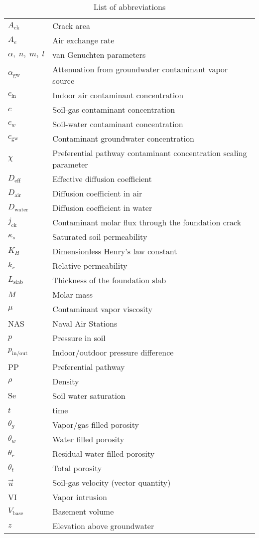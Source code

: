 \documentclass[journal=esthag,manuscript=article]{achemso}
\begin{document}
\begin{table}[htb!]
  \caption{List of abbreviations}\label{tbl:abbreviations}
\begin{tabular}{l l}
  \toprule
  $A_\mathrm{ck}$ & Crack area \\
  $A_e$ & Air exchange rate \\
  $\alpha, \; n, \; m, \; l$ & van Genuchten parameters \\
  $\alpha_\mathrm{gw}$ & Attenuation from groundwater contaminant vapor source \\
  $c_\mathrm{in}$ & Indoor air contaminant concentration \\
  $c$ & Soil-gas contaminant concentration \\
  $c_w$ & Soil-water contaminant concentration \\
  $c_\mathrm{gw}$ & Contaminant groundwater concentration \\
  $\chi$ & Preferential pathway contaminant concentration scaling parameter \\
  $D_\mathrm{eff}$ & Effective diffusion coefficient \\
  $D_\mathrm{air}$ & Diffusion coefficient in air \\
  $D_\mathrm{water}$ & Diffusion coefficient in water \\
  $j_\mathrm{ck}$ & Contaminant molar flux through the foundation crack \\
  $\kappa_s$ & Saturated soil permeability \\
  $K_H$ & Dimensionless Henry's law constant \\
  $k_r$ & Relative permeability \\
  $L_\mathrm{slab}$ & Thickness of the foundation slab \\
  $M$ & Molar mass \\
  $\mu$ & Contaminant vapor viscosity \\
  NAS & Naval Air Stations \\
  $p$ & Pressure in soil \\
  $p_\mathrm{in/out}$ & Indoor/outdoor pressure difference \\
  PP & Preferential pathway \\
  $\rho$ & Density \\
  $\mathrm{Se}$ & Soil water saturation \\
  $t$ & time \\
  $\theta_g$ & Vapor/gas filled porosity \\
  $\theta_w$ & Water filled porosity \\
  $\theta_r$ & Residual water filled porosity \\
  $\theta_t$ & Total porosity \\
  $\vec{u}$ & Soil-gas velocity (vector quantity) \\
  VI & Vapor intrusion \\
  $V_\mathrm{base}$ & Basement volume \\
  $z$ & Elevation above groundwater \\
  \bottomrule
\end{tabular}
\end{table}


\end{document}
